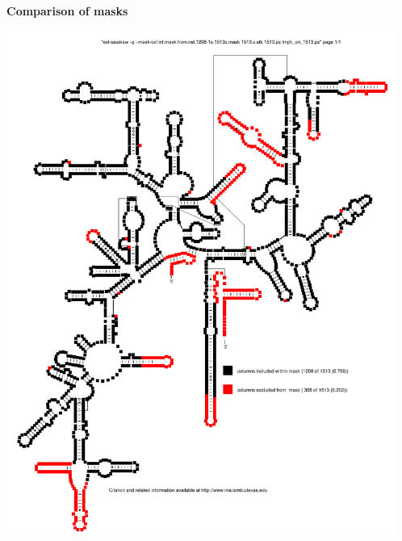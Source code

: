 \documentclass[landscape]{slides}
\begin{document}
\begin{slide}
\begin{center}
\large
\textbf{Comparison of masks}
\end{center}
\small

\begin{center}
\includegraphics[height=6.5in]{figs/lmph-on-1513}

\end{center}
\end{slide}
\end{document}
